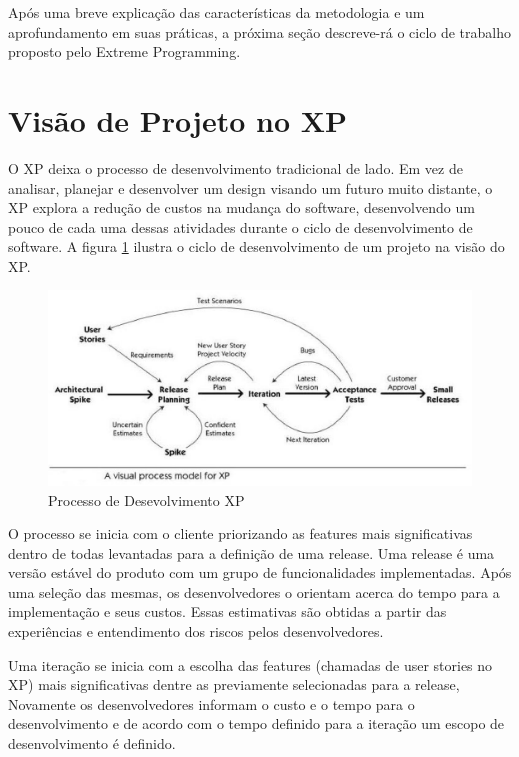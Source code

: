 Após uma breve explicação das características da metodologia e um aprofundamento em suas práticas, a próxima seção descreve-rá o ciclo de trabalho proposto pelo Extreme Programming.

\section{Visão de Projeto no XP}

O XP deixa o processo de desenvolvimento tradicional de lado. Em vez de analisar, planejar e desenvolver um design visando um futuro muito distante, o XP explora a redução de custos na mudança do software, desenvolvendo um pouco de cada uma dessas atividades durante o ciclo de desenvolvimento de software. \cite{Beck:1999} A figura \ref{fig03} ilustra o ciclo de desenvolvimento de um projeto na visão do XP.

\begin{figure}[h]
	\centering
	\includegraphics[keepaspectratio=true,scale=0.9]{figuras/fig03.eps}
	\caption{Processo de Desevolvimento XP \cite{Process}}
	\label{fig03}
\end{figure}

O processo se inicia com o cliente priorizando as features mais significativas dentro de todas levantadas para a definição de uma release. Uma release é uma versão estável do produto com um grupo de funcionalidades implementadas. Após uma seleção das mesmas, os desenvolvedores o orientam acerca do tempo para a implementação e seus custos. \cite{Beck:1999} Essas estimativas são obtidas a partir das experiências e entendimento dos riscos pelos desenvolvedores. \cite{Bernabe:2015}

Uma iteração se inicia com a escolha das features (chamadas de user stories no XP) mais significativas dentre as previamente selecionadas para a release, Novamente os desenvolvedores informam o custo e o tempo para o desenvolvimento e de acordo com o tempo definido para a iteração um escopo de desenvolvimento é definido. \cite{Beck:1999}


